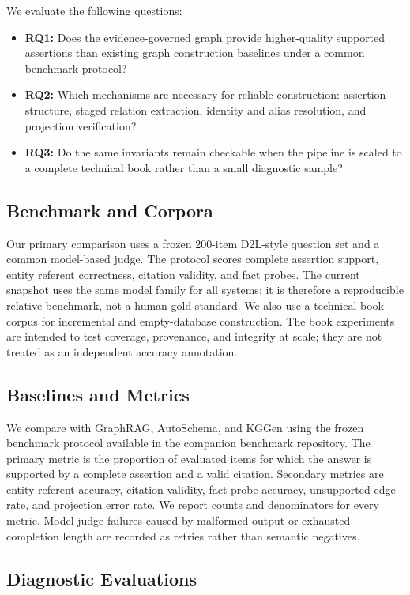 \documentclass[11pt]{article}
\begin{document}
We evaluate the following questions:
\begin{itemize}
  \item \textbf{RQ1:} Does the evidence-governed graph provide higher-quality supported assertions than existing graph construction baselines under a common benchmark protocol?
  \item \textbf{RQ2:} Which mechanisms are necessary for reliable construction: assertion structure, staged relation extraction, identity and alias resolution, and projection verification?
  \item \textbf{RQ3:} Do the same invariants remain checkable when the pipeline is scaled to a complete technical book rather than a small diagnostic sample?
\end{itemize}

\subsection{Benchmark and Corpora}

Our primary comparison uses a frozen 200-item D2L-style question set and a common model-based judge. The protocol scores complete assertion support, entity referent correctness, citation validity, and fact probes. The current snapshot uses the same model family for all systems; it is therefore a reproducible relative benchmark, not a human gold standard. We also use a technical-book corpus for incremental and empty-database construction. The book experiments are intended to test coverage, provenance, and integrity at scale; they are not treated as an independent accuracy annotation.

\subsection{Baselines and Metrics}

We compare with GraphRAG, AutoSchema, and KGGen using the frozen benchmark protocol available in the companion benchmark repository. The primary metric is the proportion of evaluated items for which the answer is supported by a complete assertion and a valid citation. Secondary metrics are entity referent accuracy, citation validity, fact-probe accuracy, unsupported-edge rate, and projection error rate. We report counts and denominators for every metric. Model-judge failures caused by malformed output or exhausted completion length are recorded as retries rather than semantic negatives.

\subsection{Diagnostic Evaluations}
\end{document}
